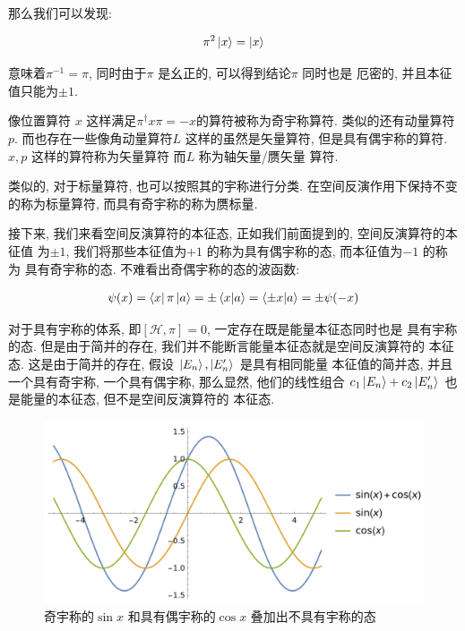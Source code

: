 那么我们可以发现:

\begin{equation}
  \begin{aligned}
    \pi^{2} \ket{x} = \ket{x}
  \end{aligned}
\end{equation}

意味着$\pi^{-1} = \pi$, 同时由于$\pi$ 是幺正的, 可以得到结论$\pi$ 同时也是
厄密的, 并且本征值只能为$\pm 1$.

像位置算符 $x$ 这样满足$\pi^{\dagger} x \pi = -x$的算符被称为奇宇称算符.
类似的还有动量算符$p$. 而也存在一些像角动量算符$L$ 这样的虽然是矢量算符,
但是具有偶宇称的算符. $x,p$ 这样的算符称为矢量算符 而$L$ 称为轴矢量/赝矢量
算符.

类似的, 对于标量算符, 也可以按照其的宇称进行分类. 在空间反演作用下保持不变
的称为标量算符, 而具有奇宇称的称为赝标量.

接下来, 我们来看空间反演算符的本征态, 正如我们前面提到的, 空间反演算符的本征值
为$\pm 1$, 我们将那些本征值为$+1$ 的称为具有偶宇称的态, 而本征值为$-1$ 的称为
具有奇宇称的态. 不难看出奇偶宇称的态的波函数:

\begin{equation}
  \begin{aligned}
    \psi(x) = \bra{x}\pi \ket{a} = \pm \bra{x}\ket{a} = \bra{\pm x}\ket{a} = 
    \pm \psi(-x)
  \end{aligned}
\end{equation}

对于具有宇称的体系, 即$[\mathcal{H}, \pi] = 0$, 一定存在既是能量本征态同时也是
具有宇称的态. 但是由于简并的存在, 我们并不能断言能量本征态就是空间反演算符的
本征态. 这是由于简并的存在, 假设 $\ket{E_{n}}, \ket{E_{n}'}$ 是具有相同能量
本征值的简并态, 并且一个具有奇宇称, 一个具有偶宇称, 那么显然, 他们的线性组合
$c_1 \ket{E_{n}} + c_2 \ket{E_{n}'}$ 也是能量的本征态, 但不是空间反演算符的
本征态.

\begin{figure}[htpb]
  \centering
  \includegraphics[width=0.8\linewidth]{figures/parity_addition_demo}
  \caption{奇宇称的$\sin x$ 和具有偶宇称的$\cos x$ 叠加出不具有宇称的态}%
  \label{fig:parity_addition_demo}
\end{figure}

